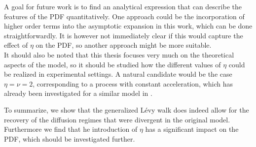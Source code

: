 A goal for future work is to find an analytical expression that can describe the features of the PDF quantitatively. One approach could be the incorporation of higher order terms into the asymptotic expansion in this work, which can be done straightforwardly. It is however not immediately clear if this would capture the effect of $\eta$ on the \gls*{PDF}, so another approach might be more suitable.\\
It should also be noted that this thesis focuses very much on the theoretical aspects of the model, so it should be studied how the different values of $\eta$ could be realized in experimental settings. A natural candidate would be the case $\eta=\nu=2$, corresponding to a process with constant acceleration, which has already been investigated for a similar model in \cite{burioni2013rare, burioni2014scaling}.

To summarize, we show that the generalized L\'evy walk does indeed allow for the recovery of the diffusion regimes that were divergent in the original model. Furthermore we find that he introduction of $\eta$ has a significant impact on the \gls*{PDF}, which should be investigated further.

